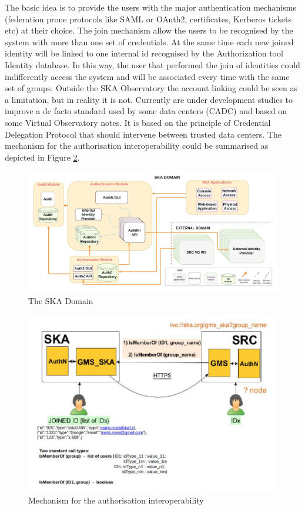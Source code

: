 \documentclass[fleqn,11pt]{wlscirep}
\begin{document}
{The basic idea is to provide the users with the major authentication mechanisms (federation prone protocols like SAML or OAuth2, certificates, Kerberos tickets etc) at their choice. The join mechanism allow the users to be recognised by the system with more than one set of credentials. At the same time each new joined identity will be linked to one internal id recognised by the Authorization tool Identity database. In this way, the user that performed the join of identities could indifferently access the system and will be associated every time with the same set of groups. Outside the SKA Observatory the account linking could be seen as a limitation, but in reality it is not. Currently are under development studies to improve a de facto standard used by some data centers (CADC) and based on some Virtual Observatory notes. It is based on the principle of Credential Delegation Protocol that should intervene between trusted data centers. The mechanism for the authorisation interoperability could be summarised as depicted in Figure \ref{fig:ska-auth}.

\begin{figure}[ht!]
  \centering
  \includegraphics[width=0.7\columnwidth]{ska-domain.png}
  \caption{The SKA Domain}
  \label{fig:ska-domain}
\end{figure}

\begin{figure}[ht!]
  \centering
  \includegraphics[width=0.7\columnwidth]{ska-auth.png}
  \caption{Mechanism for the authorisation interoperability}
  \label{fig:ska-auth}
\end{figure}

}
\end{document}
